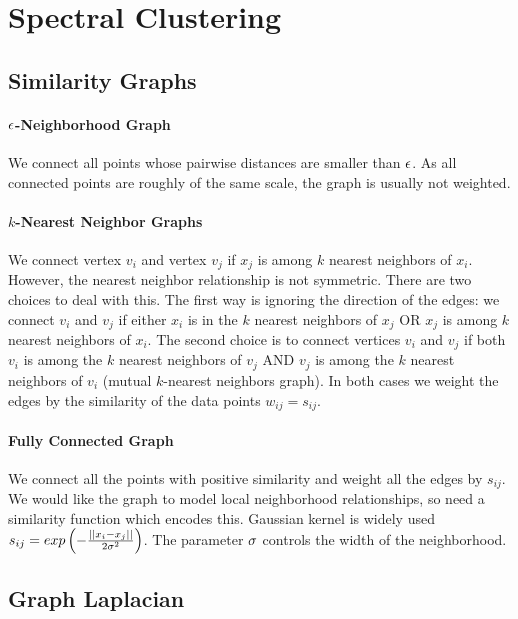 \section{Spectral Clustering}
\label{section11.2}

\subsection{Similarity Graphs}
\label{section11.2.1}

\paragraph{$\epsilon$-Neighborhood Graph}

We connect all points whose pairwise distances are smaller than $\epsilon$. As all connected points are roughly of the same scale, the graph is usually not weighted.

\paragraph{$k$-Nearest Neighbor Graphs}

We connect vertex $v_i$ and vertex $v_j$ if $x_j$ is among $k$ nearest neighbors of $x_i$. However, the nearest neighbor relationship is not symmetric. There are two choices to deal with this. The first way is ignoring the direction of the edges: we connect $v_i$ and $v_j$ if either $x_i$ is in the $k$ nearest neighbors of $x_j$ OR $x_j$ is among $k$ nearest neighbors of $x_i$. The second choice is to connect vertices $v_i$ and $v_j$ if both $v_i$ is among the $k$ nearest neighbors of $v_j$ AND $v_j$ is among the $k$ nearest neighbors of $v_i$ (mutual $k$-nearest neighbors graph). In both cases we weight the edges by the similarity of the data points $w_{ij}=s_{ij}$.

\paragraph{Fully Connected Graph}

We connect all the points with positive similarity and weight all the edges by $s_{ij}$. We would like the graph to model local neighborhood relationships, so need a similarity function which encodes this. Gaussian kernel is widely used $s_{ij}=exp\left(-\frac{\left\vert\left\vert x_i-x_j \right\vert\right\vert}{2\sigma^2}\right)$. The parameter $\sigma$ controls the width of the neighborhood.

\subsection{Graph Laplacian}

